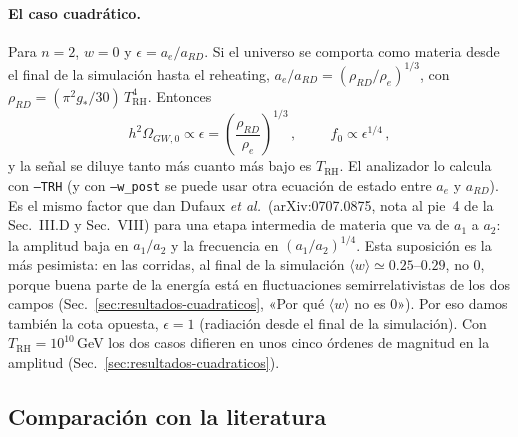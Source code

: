 \documentclass[11pt]{article}
\begin{document}
            \paragraph{El caso cuadrático.} Para $n = 2$, $w = 0$ y $\epsilon = a_e/a_{RD}$. Si el universo se comporta como materia desde el final de la simulación hasta el reheating, $a_e/a_{RD} = (\rho_{RD}/\rho_e)^{1/3}$, con $\rho_{RD} = (\pi^2 g_*/30)\,T_{\text{RH}}^4$. Entonces
            \begin{equation}
                h^2\Omega_{GW,0} \propto \epsilon = \left(\frac{\rho_{RD}}{\rho_e}\right)^{1/3} \, ,
                \hspace{1cm}
                f_0 \propto \epsilon^{1/4} \, ,
            \end{equation}
            y la señal se diluye tanto más cuanto más bajo es $T_{\text{RH}}$. El analizador lo calcula con \texttt{--TRH} (y con \texttt{--w\_post} se puede usar otra ecuación de estado entre $a_e$ y $a_{RD}$). Es el mismo factor que dan Dufaux \emph{et al.}\ (arXiv:0707.0875, nota al pie~4 de la Sec.~III.D y Sec.~VIII) para una etapa intermedia de materia que va de $a_1$ a $a_2$: la amplitud baja en $a_1/a_2$ y la frecuencia en $(a_1/a_2)^{1/4}$. Esta suposición es la más pesimista: en las corridas, al final de la simulación $\langle w\rangle \simeq 0.25$--$0.29$, no $0$, porque buena parte de la energía está en fluctuaciones semirrelativistas de los dos campos (Sec.~\ref{sec:resultados-cuadraticos}, «Por qué $\langle w\rangle$ no es 0»). Por eso damos también la cota opuesta, $\epsilon = 1$ (radiación desde el final de la simulación). Con $T_{\text{RH}} = 10^{10}$\,GeV los dos casos difieren en unos cinco órdenes de magnitud en la amplitud (Sec.~\ref{sec:resultados-cuadraticos}).

        \subsection{Comparación con la literatura}
            \label{sec:literatura}
\end{document}
